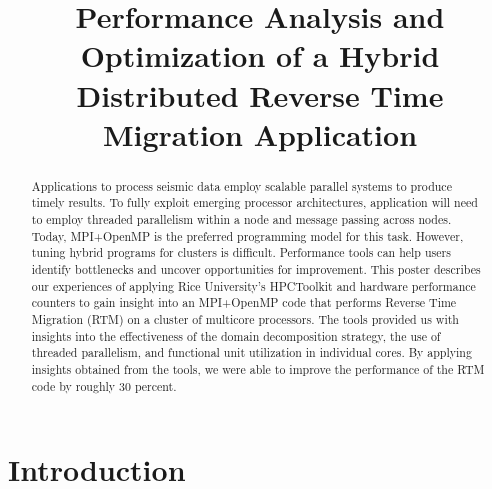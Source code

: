 \documentclass[conference]{IEEEtran}
\begin{document}
\title{Performance Analysis and Optimization of a Hybrid Distributed Reverse Time Migration Application}


\author{
\and
{}
}













\maketitle

\begin{abstract}
Applications to process seismic data employ scalable parallel systems to produce timely results. To fully exploit emerging processor architectures, application will need to employ threaded parallelism within a node and message passing across nodes. Today, MPI+OpenMP is the preferred programming model for this task. However, tuning hybrid programs for clusters is difficult. Performance tools can help users identify bottlenecks and uncover opportunities for improvement. This poster describes our experiences of applying Rice University's HPCToolkit and hardware performance counters to gain insight into an MPI+OpenMP code that performs Reverse Time Migration (RTM) on a cluster of multicore processors. The tools provided us with insights into the effectiveness of the domain decomposition strategy, the use of threaded parallelism, and functional unit utilization in individual cores. By applying insights obtained from the tools, we were able to improve the performance of the RTM code by roughly 30 percent.
\end{abstract}






\IEEEpeerreviewmaketitle



\section{Introduction}
\end{document}
